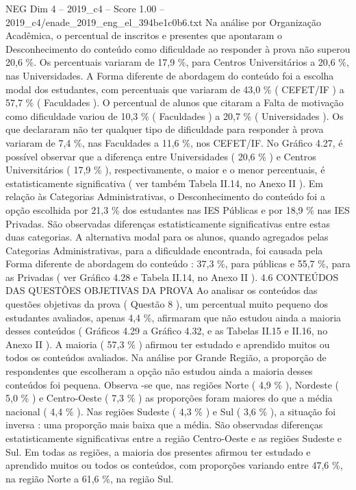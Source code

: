\begin{textsample}{NEG Dim 4 – 2019\_c4 – Score 1.00 – 2019\_c4/enade\_2019\_eng\_el\_394be1c0b6.txt}
Na análise por Organização Acadêmica, o percentual de inscritos e presentes que apontaram o Desconhecimento do conteúdo como dificuldade ao responder à prova não superou 20,6 \%.
Os percentuais variaram de 17,9 \%, para Centros Universitários a 20,6 \%, nas Universidades.
A Forma diferente de abordagem do conteúdo foi a escolha modal dos estudantes, com percentuais que variaram de 43,0 \% ( CEFET/IF ) a 57,7 \% ( Faculdades ).
O percentual de alunos que citaram a Falta de motivação como dificuldade variou de 10,3 \% ( Faculdades ) a 20,7 \% ( Universidades ).
Os que declararam não ter qualquer tipo de dificuldade para responder à prova variaram de 7,4 \%, nas Faculdades a 11,6 \%, nos CEFET/IF.
No Gráfico 4.27, é possível observar que a diferença entre Universidades ( 20,6 \% ) e Centros Universitários ( 17,9 \% ), respectivamente, o maior e o menor percentuais, é estatisticamente significativa ( ver também Tabela II.14, no Anexo II ).
Em relação às Categorias Administrativas, o Desconhecimento do conteúdo foi a opção escolhida por 21,3 \% dos estudantes nas IES Públicas e por 18,9 \% nas IES Privadas.
São observadas diferenças estatisticamente significativas entre estas duas categorias.
A alternativa modal para os alunos, quando agregados pelas Categorias Administrativas, para a dificuldade encontrada, foi causada pela Forma diferente de abordagem do conteúdo : 37,3 \%, para públicas e 55,7 \%, para as Privadas ( ver Gráfico 4.28 e Tabela II.14, no Anexo II ). 4.6 CONTEÚDOS DAS QUESTÕES OBJETIVAS DA PROVA Ao analisar os conteúdos das questões objetivas da prova ( Questão 8 ), um percentual muito pequeno dos estudantes avaliados, apenas 4,4 \%, afirmaram que não estudou ainda a maioria desses conteúdos ( Gráficos 4.29 a Gráfico 4.32, e as Tabelas II.15 e II.16, no Anexo II ).
A maioria ( 57,3 \% ) afirmou ter estudado e aprendido muitos ou todos os conteúdos avaliados.
Na análise por Grande Região, a proporção de respondentes que escolheram a opção não estudou ainda a maioria desses conteúdos foi pequena.
Observa -se que, nas regiões Norte ( 4,9 \% ), Nordeste ( 5,0 \% ) e Centro-Oeste ( 7,3 \% ) as proporções foram maiores do que a média nacional ( 4,4 \% ).
Nas regiões Sudeste ( 4,3 \% ) e Sul ( 3,6 \% ), a situação foi inversa : uma proporção mais baixa que a média.
São observadas diferenças estatisticamente significativas entre a região Centro-Oeste e as regiões Sudeste e Sul.
Em todas as regiões, a maioria dos presentes afirmou ter estudado e aprendido muitos ou todos os conteúdos, com proporções variando entre 47,6 \%, na região Norte a 61,6 \%, na região Sul.

\end{textsample}

